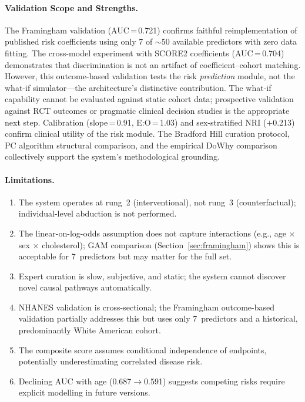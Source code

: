 \documentclass[runningheads]{llncs}
\begin{document}
\paragraph{Validation Scope and Strengths.}
The Framingham validation (AUC\,=\,0.721) confirms faithful
reimplementation of published risk coefficients using only 7 of
${\sim}$50 available predictors with zero data fitting.
The cross-model experiment with SCORE2 coefficients
(AUC\,=\,0.704) demonstrates that discrimination is not an
artifact of coefficient--cohort matching.
However, this outcome-based validation tests the risk \emph{prediction}
module, not the what-if simulator---the architecture's distinctive
contribution.
The what-if capability cannot be evaluated against static cohort data;
prospective validation against RCT outcomes or pragmatic clinical
decision studies is the appropriate next step.
Calibration (slope\,=\,0.91, E:O\,=\,1.03) and sex-stratified
NRI ($+$0.213) confirm clinical utility of the risk module.
The Bradford Hill curation protocol, PC algorithm structural
comparison, and the empirical DoWhy comparison collectively
support the system's methodological grounding.

\paragraph{Limitations.}
\begin{enumerate}
\item The system operates at rung~2 (interventional), not rung~3
  (counterfactual); individual-level abduction is not performed.
\item The linear-on-log-odds assumption does not capture interactions
  (e.g., age $\times$ sex $\times$ cholesterol); GAM comparison
  (Section~\ref{sec:framingham}) shows this is acceptable for
  7~predictors but may matter for the full set.
\item Expert curation is slow, subjective, and static; the system
  cannot discover novel causal pathways automatically.
\item NHANES validation is cross-sectional; the Framingham
  outcome-based validation partially addresses this but uses only
  7~predictors and a historical, predominantly White American cohort.
\item The composite score assumes conditional independence of
  endpoints, potentially underestimating correlated disease risk.
\item Declining AUC with age (0.687$\rightarrow$0.591) suggests
  competing risks require explicit modelling in future versions.
\end{enumerate}
\end{document}
